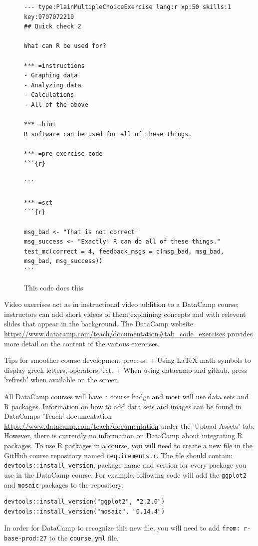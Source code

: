 \documentclass[12pt]{article}
\begin{document}
\begin{figure}
\caption{This code does this}
\begin{Verbatim}[frame=single]
--- type:PlainMultipleChoiceExercise lang:r xp:50 skills:1 key:9707072219
## Quick check 2

What can R be used for?

*** =instructions
- Graphing data
- Analyzing data
- Calculations
- All of the above

*** =hint
R software can be used for all of these things.

*** =pre_exercise_code
```{r}

```

*** =sct
```{r}

msg_bad <- "That is not correct"
msg_success <- "Exactly! R can do all of these things."
test_mc(correct = 4, feedback_msgs = c(msg_bad, msg_bad, msg_bad, msg_success))
```
\end{Verbatim}
\end{figure}


Video exercises act as in instructional video addition to a DataCamp course; instructors can add short videos of them explaining concepts and with 
relevent slides that appear in the background. The DataCamp website \url{https://www.datacamp.com/teach/documentation#tab_code_exercises} provides 
more detail on the content of the various exercises. 


Tips for smoother course development process:
    + Using LaTeX math symbols to display greek letters, operators, ect.
    + When using datacamp and github, press 'refresh' when available on the screen

All DataCamp courses will have a course badge and most will use data sets and R packages. Information on how to add data sets and images
can be found in DataCamps 'Teach' documentation \url{https://www.datacamp.com/teach/documentation} under the 'Upload Assets' tab. However,
there is currently no information on DataCamp about integrating R packages. To use R packages in a course, you will need to create a new file
in the GitHub course repository named \texttt{requirements.r}. The file should contain: \texttt{devtools::install\_version}, package name and version for 
every package you use in the DataCamp course. For example, following code will add the \texttt{ggplot2} and \texttt{mosaic} packages to the repository.

\begin{verbatim}
devtools::install_version("ggplot2", "2.2.0")
devtools::install_version("mosaic", "0.14.4")
\end{verbatim}
In order for DataCamp to recognize this new file, you will need to add \texttt{from: r-base-prod:27} to the \texttt{course.yml} file.
\end{document}
